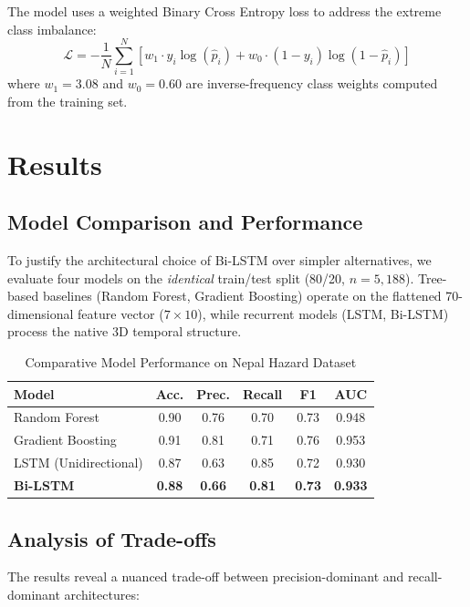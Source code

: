 \documentclass[journal,twoside]{IEEEtran}
\begin{document}
The model uses a weighted Binary Cross Entropy loss to address the extreme class imbalance:
\begin{equation}
    \mathcal{L} = -\frac{1}{N}\sum_{i=1}^{N}\left[w_1 \cdot y_i \log(\hat{p}_i) + w_0 \cdot (1-y_i)\log(1-\hat{p}_i)\right]
\end{equation}
where $w_1 = 3.08$ and $w_0 = 0.60$ are inverse-frequency class weights computed from the training set.

\section{Results}

\subsection{Model Comparison and Performance}
To justify the architectural choice of Bi-LSTM over simpler alternatives, we evaluate four models on the \textit{identical} train/test split (80/20, $n=5{,}188$). Tree-based baselines (Random Forest, Gradient Boosting) operate on the flattened 70-dimensional feature vector ($7 \times 10$), while recurrent models (LSTM, Bi-LSTM) process the native 3D temporal structure.

\begin{table}[h!]
\centering
\caption{Comparative Model Performance on Nepal Hazard Dataset}
\begin{tabular}{l c c c c c}
\toprule
\textbf{Model} & \textbf{Acc.} & \textbf{Prec.} & \textbf{Recall} & \textbf{F1} & \textbf{AUC} \\
\midrule
Random Forest       & 0.90 & 0.76 & 0.70 & 0.73 & 0.948 \\
Gradient Boosting   & 0.91 & 0.81 & 0.71 & 0.76 & 0.953 \\
LSTM (Unidirectional) & 0.87 & 0.63 & 0.85 & 0.72 & 0.930 \\
\textbf{Bi-LSTM}    & \textbf{0.88} & \textbf{0.66} & \textbf{0.81} & \textbf{0.73} & \textbf{0.933} \\
\bottomrule
\end{tabular}
\end{table}

\subsection{Analysis of Trade-offs}

The results reveal a nuanced trade-off between precision-dominant and recall-dominant architectures:
\end{document}
